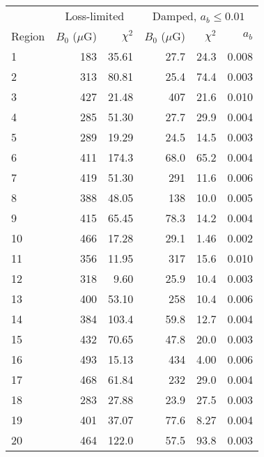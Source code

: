 \begin{tabular}{@{} l rr rrr @{}}
\toprule
{} & \multicolumn{2}{c}{Loss-limited}
   & \multicolumn{3}{c}{Damped, $a_b \leq 0.01$} \\
\cmidrule(lr){2-3} \cmidrule(l){4-6}
Region & $B_0$ ($\mu$G) & $\chi^2$
       & $B_0$ ($\mu$G) & $\chi^2$ & $a_b$ \\
\midrule
 1 & 183 & 35.61 & 27.7 & 24.3 & 0.008 \\
 2 & 313 & 80.81 & 25.4 & 74.4 & 0.003 \\
 3 & 427 & 21.48 & 407 & 21.6 & 0.010 \\
\cmidrule{1-6}
 4 & 285 & 51.30 & 27.7 & 29.9 & 0.004 \\
 5 & 289 & 19.29 & 24.5 & 14.5 & 0.003 \\
 6 & 411 & 174.3 & 68.0 & 65.2 & 0.004 \\
 7 & 419 & 51.30 & 291 & 11.6 & 0.006 \\
 8 & 388 & 48.05 & 138 & 10.0 & 0.005 \\
 9 & 415 & 65.45 & 78.3 & 14.2 & 0.004 \\
10 & 466 & 17.28 & 29.1 & 1.46 & 0.002 \\
\cmidrule{1-6}
11 & 356 & 11.95 & 317 & 15.6 & 0.010 \\
12 & 318 & 9.60 & 25.9 & 10.4 & 0.003 \\
13 & 400 & 53.10 & 258 & 10.4 & 0.006 \\
\cmidrule{1-6}
14 & 384 & 103.4 & 59.8 & 12.7 & 0.004 \\
15 & 432 & 70.65 & 47.8 & 20.0 & 0.003 \\
16 & 493 & 15.13 & 434 & 4.00 & 0.006 \\
17 & 468 & 61.84 & 232 & 29.0 & 0.004 \\
\cmidrule{1-6}
18 & 283 & 27.88 & 23.9 & 27.5 & 0.003 \\
19 & 401 & 37.07 & 77.6 & 8.27 & 0.004 \\
20 & 464 & 122.0 & 57.5 & 93.8 & 0.003 \\
\bottomrule
\end{tabular}
